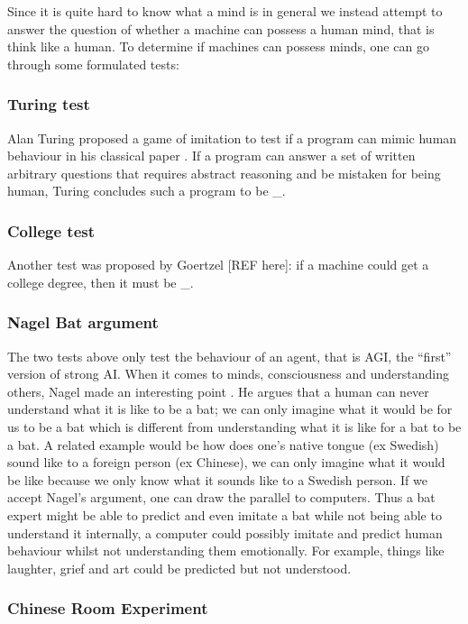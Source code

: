\documentclass[11pt]{article}
\begin{document}
Since it is quite hard to know what a mind is in general we instead attempt to answer the question of whether a machine can possess a human mind, that is think like a human. To determine if machines can possess minds, one can go through some formulated tests:

\subsubsection{Turing test}

Alan Turing proposed a game of imitation to test if a program can mimic human behaviour in his classical paper \cite{turing1950computing}. If a program can answer a set of written arbitrary questions that requires abstract reasoning and be mistaken for being human, Turing concludes such a program to be \_.

\subsubsection{College test}

Another test was proposed by Goertzel [REF here]: if a machine could get a college degree, then it must be \_.

\subsubsection{Nagel Bat argument}

The two tests above only test the behaviour of an agent, that is AGI, the “first” version of strong AI. When it comes to minds, consciousness and understanding others, Nagel made an interesting point \cite{nagel1974like}. He argues that a human can never understand what it is like to be a bat; we can only imagine what it would be for us to be a bat which is different from understanding what it is like for a bat to be a bat. A related example would be how does one’s native tongue (ex Swedish) sound like to a foreign person (ex Chinese), we can only imagine what it would be like because we only know what it sounds like to a Swedish person. If we accept Nagel’s argument, one can draw the parallel to computers. Thus a bat expert might be able to predict and even imitate a bat while not being able to understand it internally, a computer could possibly imitate and predict human behaviour whilst not understanding them emotionally. For example, things like laughter, grief and art could be predicted but not understood.

\subsubsection{Chinese Room Experiment}
\end{document}
